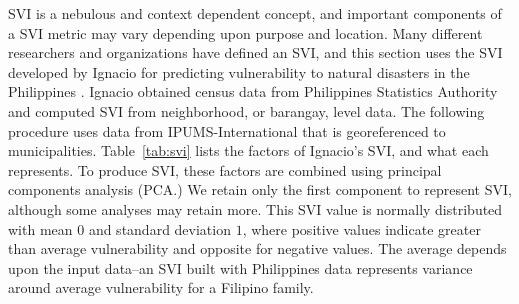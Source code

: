 \documentclass[draft]{article}
\begin{document}
SVI is a nebulous and context dependent concept, and important components of a SVI metric may vary depending upon purpose and location.  Many different researchers and organizations have defined an SVI, and this section uses the SVI developed by Ignacio for predicting vulnerability to natural disasters in the Philippines \cite{ignacio15}.  Ignacio obtained census data from Philippines Statistics Authority and computed SVI from neighborhood, or barangay, level data.  The following procedure uses data from IPUMS-International \cite{ipumsi} that is georeferenced to municipalities.  Table~\ref{tab:svi} lists the factors of Ignacio's SVI, and what each represents.  To produce SVI, these factors are combined using principal components analysis (PCA.)  We retain only the first component to represent SVI, although some analyses may retain more.  This SVI value is normally distributed with mean $0$ and standard deviation $1$, where positive values indicate greater than average vulnerability and opposite for negative values.  The average depends upon the input data--an SVI built with Philippines data represents variance around average vulnerability for a Filipino family.
\end{document}
